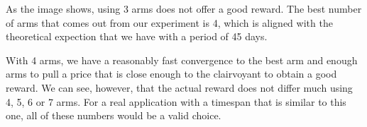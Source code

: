 As the image shows, using 3 arms does not offer a good reward. The best number of arms that comes out from our experiment is 4, which is aligned with the theoretical expection that we have with a period of 45 days.

With 4 arms, we have a reasonably fast convergence to the best arm and enough arms to pull a price that is close enough to the clairvoyant to obtain a good reward.
We can see, however, that the actual reward does not differ much using 4, 5, 6 or 7 arms. For a real application with a timespan that is similar to this one, all of these numbers would be a valid choice.